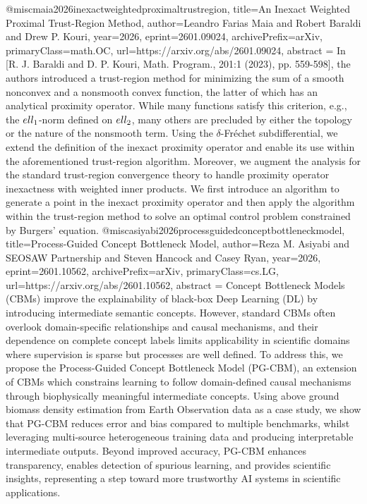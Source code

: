{}@misc{maia2026inexactweightedproximaltrustregion,
      title={An Inexact Weighted Proximal Trust-Region Method}, 
      author={Leandro Farias Maia and Robert Baraldi and Drew P. Kouri},
      year={2026},
      eprint={2601.09024},
      archivePrefix={arXiv},
      primaryClass={math.OC},
      url={https://arxiv.org/abs/2601.09024},
      abstract = {In [R. J. Baraldi and D. P. Kouri, Math. Program., 201:1 (2023), pp. 559-598], the authors introduced a trust-region method for minimizing the sum of a smooth nonconvex and a nonsmooth convex function, the latter of which has an analytical proximity operator. While many functions satisfy this criterion, e.g., the $\\ell_1$-norm defined on $\\ell_2$, many others are precluded by either the topology or the nature of the nonsmooth term. Using the $δ$-Fréchet subdifferential, we extend the definition of the inexact proximity operator and enable its use within the aforementioned trust-region algorithm. Moreover, we augment the analysis for the standard trust-region convergence theory to handle proximity operator inexactness with weighted inner products. We first introduce an algorithm to generate a point in the inexact proximity operator and then apply the algorithm within the trust-region method to solve an optimal control problem constrained by Burgers' equation.}
}@misc{asiyabi2026processguidedconceptbottleneckmodel,
      title={Process-Guided Concept Bottleneck Model}, 
      author={Reza M. Asiyabi and SEOSAW Partnership and Steven Hancock and Casey Ryan},
      year={2026},
      eprint={2601.10562},
      archivePrefix={arXiv},
      primaryClass={cs.LG},
      url={https://arxiv.org/abs/2601.10562},
      abstract = {Concept Bottleneck Models (CBMs) improve the explainability of black-box Deep Learning (DL) by introducing intermediate semantic concepts. However, standard CBMs often overlook domain-specific relationships and causal mechanisms, and their dependence on complete concept labels limits applicability in scientific domains where supervision is sparse but processes are well defined. To address this, we propose the Process-Guided Concept Bottleneck Model (PG-CBM), an extension of CBMs which constrains learning to follow domain-defined causal mechanisms through biophysically meaningful intermediate concepts. Using above ground biomass density estimation from Earth Observation data as a case study, we show that PG-CBM reduces error and bias compared to multiple benchmarks, whilst leveraging multi-source heterogeneous training data and producing interpretable intermediate outputs. Beyond improved accuracy, PG-CBM enhances transparency, enables detection of spurious learning, and provides scientific insights, representing a step toward more trustworthy AI systems in scientific applications.}
}
